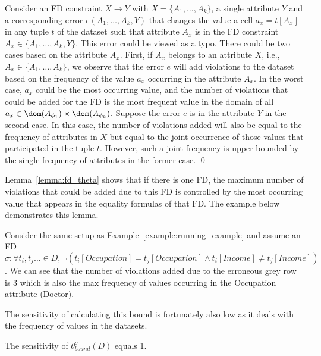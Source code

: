 \proof
Consider an FD constraint $X \rightarrow Y$ with $X = \{A_1,\dots,A_k\}$, a single attribute $Y$ and a corresponding error $e(A_1, \dots, A_k, Y)$ that changes the value a cell $a_x = t[A_x]$ in any tuple $t$ of the dataset such that attribute $A_x$ is in the FD constraint $A_x \in \{A_1, \dots, A_k, Y\}$. This error could be viewed as a typo. There could be two cases based on the attribute $A_x$. First, if $A_x$ belongs to an attribute $X$, i.e., $A_x \in \{A_1, \dots, A_k\}$, we observe that the error $e$ will add violations to the dataset based on the frequency of the value $a_x$ occurring in the attribute $A_x$. In the worst case, $a_x$ could be the most occurring value, and the number of violations that could be added for the FD is the most frequent value in the domain of all $a_x \in \dom(A_{\phi_1}) \times \dom(A_{\phi_k})$. Suppose the error $e$ is in the attribute $Y$ in the second case. In this case, the number of violations added will also be equal to the frequency of attributes in $X$ but equal to the joint occurrence of those values that participated in the tuple $t$. However, such a joint frequency is upper-bounded by the single frequency of attributes in the former case.   \qed

Lemma~\ref{lemma:fd_theta} shows that if there is one FD, the maximum number of violations that could be added due to this FD is controlled by the most occurring value that appears in the equality formulas of that FD. The example below demonstrates this lemma.

\begin{example}
    Consider the same setup as  Example~\ref{example:running_example} and assume an FD $\sigma : \forall t_i, t_j \dots \in D, \neg(t_i[Occupation] = t_j[Occupation] \land t_i[Income] \neq t_j[Income])$. We can see that the number of violations added due to the erroneous grey row is 3 which is also the max frequency of values occurring in the Occupation attribute (Doctor). 
\end{example}

The sensitivity of calculating this bound is fortunately also low as it deals with the frequency of values in the datasets. 

\begin{lemma}\label{lemma:sens_fd_theta}
    The sensitivity of $\theta_{bound}^\sigma(D)$ equals 1. 
\end{lemma}

